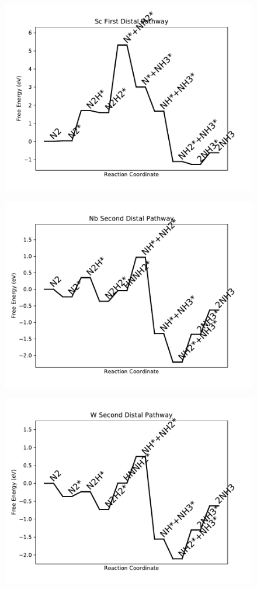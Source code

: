 \begin{figure}
\includegraphics[width=0.8\linewidth]{data/plots/Sc_distal_1.pdf}
\label{fig:Sc_distal_1}
\end{figure}

\begin{figure}
\includegraphics[width=0.8\linewidth]{data/plots/Nb_distal_2.pdf}
\label{fig:Nb_distal_2}
\end{figure}

\begin{figure}
\includegraphics[width=0.8\linewidth]{data/plots/W_distal_2.pdf}
\label{fig:W_distal_2}
\end{figure}

